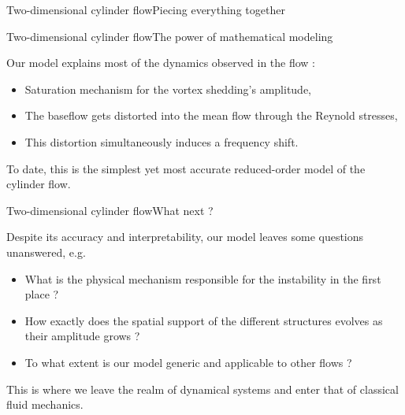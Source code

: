 \documentclass[usenames,dvipsnames,svgnames,10pt,aspectratio=169]{beamer}
\begin{document}
\begin{frame}[t, c]{Two-dimensional cylinder flow}{Piecing everything together}

\end{frame}




\begin{frame}[t, c]{Two-dimensional cylinder flow}{The power of mathematical modeling}
  \begin{minipage}{.68\textwidth}
    Our model explains most of the dynamics observed in the flow :

    \medskip

    \begin{itemize}
    \item Saturation mechanism for the vortex shedding's amplitude,
    \item The baseflow gets distorted into the mean flow through the Reynold stresses,
    \item This distortion simultaneously induces a frequency shift.
    \end{itemize}

    \medskip

    To date, this is the simplest yet most accurate reduced-order model of the cylinder flow.
  \end{minipage}%
  \hfill
  \begin{minipage}{.28\textwidth}
  \end{minipage}
\end{frame}




\begin{frame}[t, c]{Two-dimensional cylinder flow}{What next ?}
  \begin{minipage}{.68\textwidth}
    Despite its accuracy and interpretability, our model leaves some questions unanswered, e.g.

    \medskip

    \begin{itemize}
    \item What is the physical mechanism responsible for the instability in the first place ?
    \item How exactly does the spatial support of the different structures evolves as their amplitude grows ?
    \item To what extent is our model generic and applicable to other flows ?
    \end{itemize}

    \medskip

    This is where we leave the realm of dynamical systems and enter that of classical fluid mechanics.

  \end{minipage}%
  \hfill
  \begin{minipage}{.28\textwidth}
  \end{minipage}
\end{frame}

\begin{frame}
\end{frame}
\end{document}
